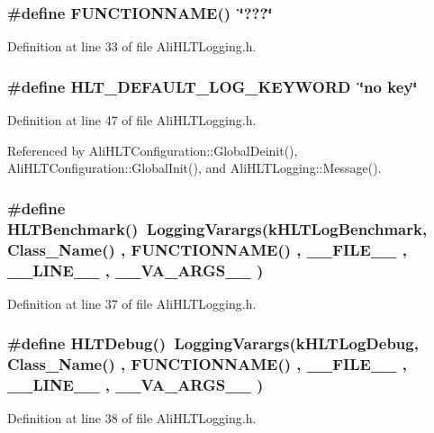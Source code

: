 \subsubsection{\setlength{\rightskip}{0pt plus 5cm}\#define FUNCTIONNAME()\ \char`\"{}???\char`\"{}}\label{AliHLTLogging_8h_a1}




Definition at line 33 of file Ali\-HLTLogging.h.
\subsubsection{\setlength{\rightskip}{0pt plus 5cm}\#define HLT\_\-DEFAULT\_\-LOG\_\-KEYWORD\ \char`\"{}no key\char`\"{}}\label{AliHLTLogging_8h_a9}




Definition at line 47 of file Ali\-HLTLogging.h.

Referenced by Ali\-HLTConfiguration::Global\-Deinit(), Ali\-HLTConfiguration::Global\-Init(), and Ali\-HLTLogging::Message().
\subsubsection{\setlength{\rightskip}{0pt plus 5cm}\#define HLTBenchmark()\ Logging\-Varargs(k\-HLTLog\-Benchmark, Class\_\-Name() , FUNCTIONNAME() , \_\-\_\-FILE\_\-\_\- , \_\-\_\-LINE\_\-\_\- , \_\-\_\-VA\_\-ARGS\_\-\_\- )}\label{AliHLTLogging_8h_a2}




Definition at line 37 of file Ali\-HLTLogging.h.
\subsubsection{\setlength{\rightskip}{0pt plus 5cm}\#define HLTDebug()\ Logging\-Varargs(k\-HLTLog\-Debug,     Class\_\-Name() , FUNCTIONNAME() , \_\-\_\-FILE\_\-\_\- , \_\-\_\-LINE\_\-\_\- , \_\-\_\-VA\_\-ARGS\_\-\_\- )}\label{AliHLTLogging_8h_a3}




Definition at line 38 of file Ali\-HLTLogging.h.

